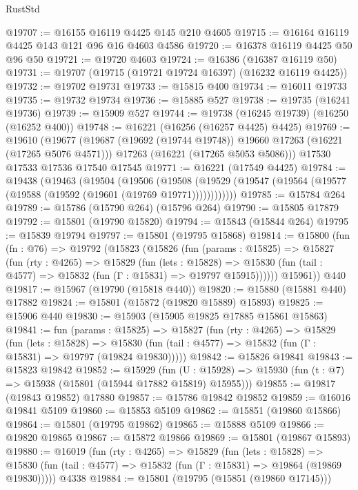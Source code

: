 \begin{lexlean}{RustStd}
\begin{coremodule}
@19707 := @16155 @16119 @4425 @145 @210 @4605
@19715 := @16164 @16119 @4425 @143 @121 @96 @16 @4603 @4586
@19720 := @16378 @16119 @4425 @50 @96 @50
@19721 := @19720 @4603
@19724 := @16386 (@16387 @16119 @50)
@19731 := @19707 (@19715 (@19721 @19724 @16397) (@16232 @16119 @4425))
@19732 := @19702 @19731
@19733 := @15815 @400
@19734 := @16011 @19733
@19735 := @19732 @19734
@19736 := @15885 @527
@19738 := @19735 (@16241 @19736)
@19739 := @15909 @527
@19744 := @19738 (@16245 @19739) (@16250 (@16252 @400))
@19748 := @16221 (@16256 (@16257 @4425) @4425)
@19769 := @19610
    (@19677
      (@19687 (@19692 (@19744 @19748)) @19660 @17263 (@16221 (@17265 @5076 @4571)))
      @17263
      (@16221 (@17265 @5053 @5086)))
    @17530
    @17533
    @17536
    @17540
    @17545
@19771 := @16221 (@17549 @4425)
@19784 := @19438
    (@19463
      (@19504
        (@19506
          (@19508 (@19529 (@19547 (@19564 (@19577 (@19588 (@19592 (@19601 (@19769 @19771))))))))))))
@19785 := @15784 @264
@19789 := @15786 (@15790 @264) (@15796 @264)
@19790 := @15805 @17879
@19792 := @15801 (@19790 @15820)
@19794 := @15843 (@15844 @264)
@19795 := @15839 @19794
@19797 := @15801 (@19795 @15868)
@19814 := @15800
    (fun (fn : @76) =>
    @19792
      (@15823
        (@15826
          (fun (params : @15825) =>
          @15827
            (fun (rty : @4265) =>
            @15829
              (fun (lets : @15828) =>
              @15830 (fun (tail : @4577) => @15832 (fun (Γ : @15831) => @19797 @15915))))))
        @15961))
    @440
@19817 := @15967 (@19790 (@15818 @440))
@19820 := @15880 (@15881 @440) @17882
@19824 := @15801 (@15872 (@19820 @15889) @15893)
@19825 := @15906 @440
@19830 := @15903 (@15905 @19825 @17885 @15861 @15863)
@19841 := fun (params : @15825) =>
  @15827
    (fun (rty : @4265) =>
    @15829
      (fun (lets : @15828) =>
      @15830 (fun (tail : @4577) => @15832 (fun (Γ : @15831) => @19797 (@19824 @19830)))))
@19842 := @15826 @19841
@19843 := @15823 @19842
@19852 := @15929
    (fun (U : @15928) => @15930 (fun (t : @7) => @15938 (@15801 (@15944 @17882 @15819) @15955)))
@19855 := @19817 (@19843 @19852) @17880
@19857 := @15786 @19842 @19852
@19859 := @16016 @19841 @5109
@19860 := @15853 @5109
@19862 := @15851 (@19860 @15866)
@19864 := @15801 (@19795 @19862)
@19865 := @15888 @5109
@19866 := @19820 @19865
@19867 := @15872 @19866
@19869 := @15801 (@19867 @15893)
@19880 := @16019
    (fun (rty : @4265) =>
    @15829
      (fun (lets : @15828) =>
      @15830 (fun (tail : @4577) => @15832 (fun (Γ : @15831) => @19864 (@19869 @19830)))))
    @4338
@19884 := @15801 (@19795 (@15851 (@19860 @17145)))

\end{coremodule}
\end{lexlean}
